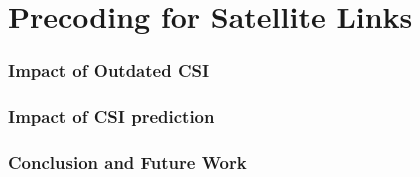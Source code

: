 \chapter{Precoding for Satellite Links}
\label{chapter:satellite_precoding}

\subsection{Impact of Outdated CSI}

\subsection{Impact of CSI prediction}

\subsection{Conclusion and Future Work}

